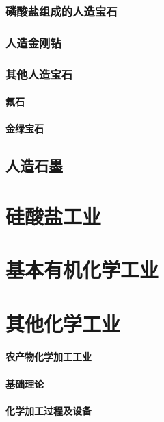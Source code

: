 \documentclass[UTF8]{../../ApplicationUniverse}
\begin{document}
    \subsection{磷酸盐组成的人造宝石}
    \subsection{人造金刚钻}
    \subsection{其他人造宝石}
        \subsubsection{氟石}
        \subsubsection{金绿宝石}
\section{人造石墨}







\chapter{硅酸盐工业} %



\chapter{基本有机化学工业} %





\chapter{其他化学工业}
\subsubsection{农产物化学加工工业}
    \subsubsection{基础理论}
    \subsubsection{化学加工过程及设备}
\end{document}
